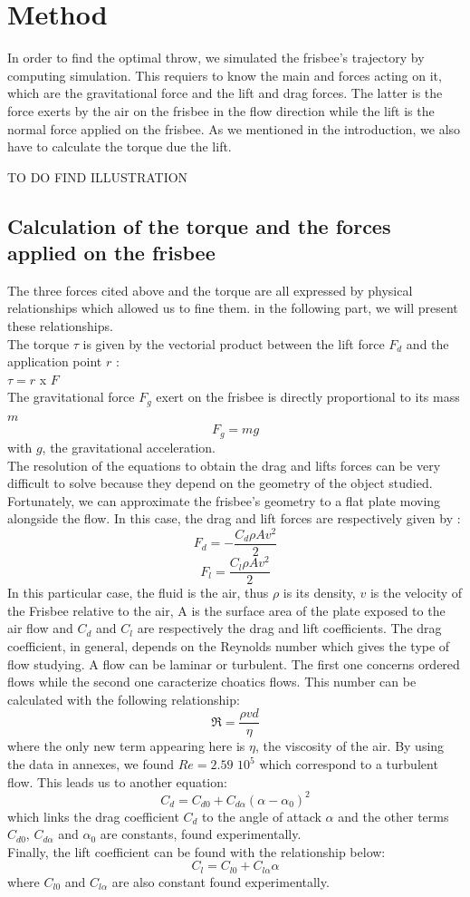 \documentclass[10pt,a4paper]{report}
\begin{document}
\section{Method}
In order to find the optimal throw, we simulated the frisbee's trajectory by computing simulation. This requiers to know the main and forces acting on it, which are the gravitational force and the lift and drag forces. The latter is the force exerts by the air on the frisbee in the flow direction while the lift is the normal force applied on the frisbee. As we mentioned in the introduction, we also have to calculate the torque due the lift.

TO DO FIND ILLUSTRATION

\subsection{Calculation of the torque and the forces applied on the frisbee}
The three forces cited above and the torque are all expressed by physical relationships which allowed us to fine them. in the following part, we will present these relationships.
\\
The torque $\tau$ is given by the vectorial product between the lift force $F_d$ and the application point $r$ : 
\\$\tau=r$ x $F$
\\
The gravitational force $F_g$ exert on the frisbee is directly proportional to its mass $m$
\[F_g = m g\]
with $g$, the gravitational acceleration.
\\
The resolution of the equations to obtain the drag and lifts forces can be very difficult to solve because they depend on the geometry of the object studied. Fortunately, we can approximate the frisbee's geometry to a flat plate moving alongside the flow. In this case, the drag and lift forces are respectively given by :
\[F_d = -\frac{C_d \rho A  v^2}{2}\]
\[F_l = \frac{C_l \rho A  v^2}{2}\]
In this particular case, the fluid is the air, thus $\rho$ is its density, $v$ is the velocity of the Frisbee relative to the air, A is the surface area of the plate exposed to the air flow and $C_d$ and $C_l$ are respectively the drag and lift coefficients.
The drag coefficient, in general, depends on the Reynolds number which gives the type of flow studying. A flow can be laminar or turbulent. The first one concerns ordered flows while the second one caracterize choatics flows. This number can be calculated with the following relationship:
\[\Re = \frac{\rho v d}{\eta}\]
where the only new term appearing here is $\eta$, the viscosity of the air.
By using the data in annexes, we found $Re=2.59$ $10^5$ which correspond to a turbulent flow.
This leads us to another equation:
\[C_d = C_{d0} + C_{d\alpha}(\alpha-\alpha_0)^2\]
which links the drag coefficient $C_d$ to the angle of attack $\alpha$ and the other terms $C_{d0}$, $C_{d\alpha}$ and $\alpha_0$ are constants, found experimentally.
\\Finally, the lift coefficient can be found with the relationship below:
\[C_l = C_{l0} + C_{l \alpha} \alpha\]
where $C_{l0}$ and $C_{l\alpha}$ are also constant found experimentally.
\end{document}
